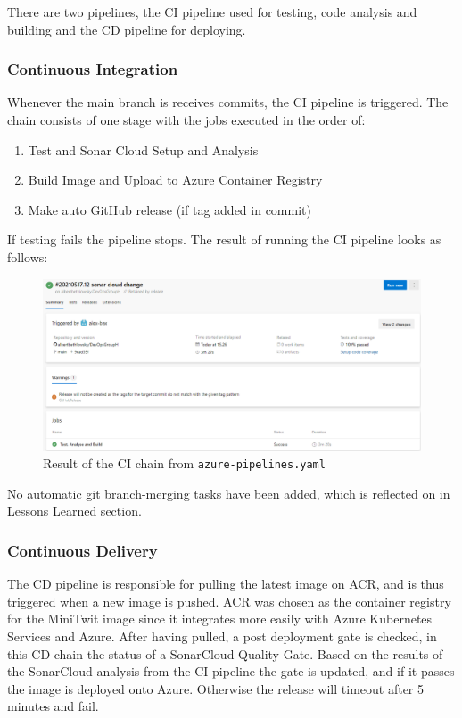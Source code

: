 \documentclass{article}
\begin{document}
There are two pipelines, the CI pipeline used for testing, code analysis and building and the CD pipeline for deploying. 

\subsubsection*{Continuous Integration}
Whenever the main branch is receives commits, the CI pipeline is triggered. The chain consists of one stage with the jobs executed in the order of: 
\begin{enumerate}
    \item Test and Sonar Cloud Setup and Analysis
    \item Build Image and Upload to Azure Container Registry 
    \item Make auto GitHub release (if tag added in commit)
\end{enumerate}

If testing fails the pipeline stops. The result of running the CI pipeline looks as follows:

\begin{figure}[H]
\centering
\includegraphics[width=1\textwidth]{images/pipeline-result.png}
\caption{\label{fig:res} Result of the CI chain from \texttt{azure-pipelines.yaml}}
\end{figure}

No automatic git branch-merging tasks have been added, which is reflected on in Lessons Learned section. %

\subsubsection*{Continuous Delivery}
The CD pipeline is responsible for pulling the latest image on ACR, and is thus triggered when a new image is pushed. ACR was chosen as the container registry for the MiniTwit image since it integrates more easily with Azure Kubernetes Services and Azure. After having pulled, a post deployment gate is checked, in this CD chain the status of a SonarCloud Quality Gate. Based on the results of the SonarCloud analysis from the CI pipeline the gate is updated, and if it passes the image is deployed onto Azure. Otherwise the release will timeout after 5 minutes and fail.   
\end{document}
